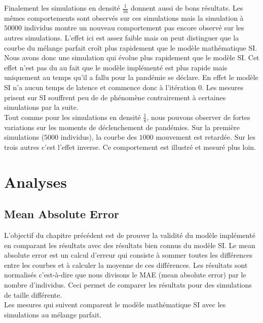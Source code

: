 Finalement les simulations en densité $\frac{1}{16}$ donnent aussi de bons résultats. Les mêmes comportements sont observés sur ces simulations mais la simulation à $50000$ individus montre un nouveau comportement pas encore observé sur les autres simulations. L'effet ici est assez faible mais on peut distinguer que la courbe du mélange parfait croît plus rapidement que le modèle mathématique SI. Nous avons donc une simulation qui évolue plus rapidement que le modèle SI. Cet effet n'est pas du au fait que le modèle implémenté est plus rapide mais uniquement au temps qu'il a fallu pour la pandémie se déclare. En effet le modèle SI n'a aucun temps de latence et commence donc à l'itération $0$. Les mesures prisent sur SI souffrent peu de de phénomène contrairement à certaines simulations par la suite. \\

Tout comme pour les simulations en densité $\frac{1}{8}$, nous pouvons observer de fortes variations sur les moments de déclenchement de pandémies. Sur la première simulations ($5000$ individus), la courbe des $1000$ mouvement est retardée. Sur les trois autres c'est l'effet inverse. Ce comportement est illustré et mesuré plus loin.

\newpage

\section{Analyses}

\subsection{Mean Absolute Error}

L'objectif du chapitre précédent est de prouver la validité du modèle implémenté en comparant les résultats avec des résultats bien connus du modèle SI. Le mean absolute error est un calcul d'erreur qui consiste à sommer toutes les différences entre les courbes et à calculer la moyenne de ces différences. Les résultats sont normalisés c'est-à-dire que nous divisons le MAE (mean absolute error) par le nombre d'individus. Ceci permet de comparer les résultats pour des simulations de taille différente.\\

Les mesures qui suivent comparent le modèle mathématique SI avec les simulations au mélange parfait.

